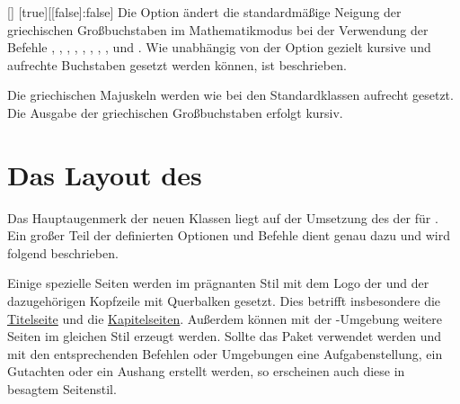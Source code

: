 \documentclass[%
  english,ngerman,%
  headings=optiontoheadandtoc,captions=tableheading,numbers=noenddot,%
  chapterpage,cdfoot,%
]{tudscrman}
\begin{document}
\begin{Declaration}{[\PBoolean]}%
  [true][[false]:false]
\printdeclarationlist%
%
%
%
Die Option ändert die standardmäßige Neigung der griechischen Großbuchstaben im 
Mathematikmodus bei der Verwendung der Befehle , , 
, , , , , 
,  und . Wie unabhängig von der Option 
 gezielt kursive und aufrechte Buchstaben gesetzt werden 
können, ist  beschrieben.
%
\begin{values}
\itemfalse
  Die griechischen Majuskeln werden wie bei den Standardklassen aufrecht gesetzt.
\itemtrue*
  Die Ausgabe der griechischen Großbuchstaben erfolgt kursiv.
\end{values}
\end{Declaration}

\section{Das Layout des \CDs}
Das Hauptaugenmerk der neuen Klassen liegt auf der Umsetzung des \CDs der
\TnUD für . Ein großer Teil der definierten Optionen und Befehle
dient genau dazu und wird folgend beschrieben.

Einige spezielle Seiten werden im prägnanten Stil mit dem Logo der \TnUD und der 
dazugehörigen Kopfzeile mit Querbalken gesetzt. Dies betrifft insbesondere die 
\hyperref[sec:title]{Titelseite} und die \hyperref[sec:chapter]{Kapitelseiten}. 
Außerdem können mit der -Umgebung weitere Seiten im 
gleichen Stil erzeugt werden. Sollte das Paket  
verwendet werden und mit den entsprechenden Befehlen oder Umgebungen eine 
Aufgabenstellung, ein Gutachten oder ein Aushang erstellt werden, so erscheinen 
auch diese in besagtem Seitenstil.
\end{document}
